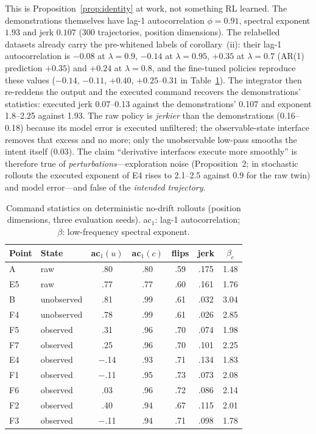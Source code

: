 \documentclass[conference]{IEEEtran}
\begin{document}
This is Proposition~\ref{prop:identity} at work, not something RL learned. The demonstrations themselves have lag-1 autocorrelation $\phi=0.91$, spectral exponent $1.93$ and jerk $0.107$ (300 trajectories, position dimensions). The relabelled datasets already carry the pre-whitened labels of corollary~(ii): their lag-1 autocorrelation is $-0.08$ at $\lambda=0.9$, $-0.14$ at $\lambda=0.95$, $+0.35$ at $\lambda=0.7$ (AR(1) prediction $+0.35$) and $+0.24$ at $\lambda=0.8$, and the fine-tuned policies reproduce these values ($-0.14$, $-0.11$, $+0.40$, $+0.25$--$0.31$ in Table~\ref{tab:white}). The integrator then re-reddens the output and the executed command recovers the demonstrations' statistics: executed jerk 0.07--0.13 against the demonstrations' 0.107 and exponent 1.8--2.25 against 1.93. The raw policy is \emph{jerkier} than the demonstrations (0.16--0.18) because its model error is executed unfiltered; the observable-state interface removes that excess and no more; only the unobservable low-pass smooths the intent itself (0.03). The claim ``derivative interfaces execute more smoothly'' is therefore true of \emph{perturbations}---exploration noise (Proposition~2; in stochastic rollouts the executed exponent of E4 rises to 2.1--2.5 against 0.9 for the raw twin) and model error---and false of the \emph{intended trajectory}.

\begin{table}[t]
\centering
\caption{Command statistics on deterministic no-drift rollouts (position dimensions, three evaluation seeds). ac$_1$: lag-1 autocorrelation; $\beta$: low-frequency spectral exponent.}
\label{tab:white}
\small
\begin{tabular}{l l cc c c c}
\toprule
Point & State & ac$_1(u)$ & ac$_1(c)$ & flips & jerk & $\beta_c$ \\
\midrule
A  & raw & .80 & .80 & .59 & .175 & 1.48 \\
E5 & raw & .77 & .77 & .60 & .161 & 1.76 \\
B  & unobserved & .81 & .99 & .61 & .032 & 3.04 \\
F4 & unobserved & .78 & .99 & .61 & .026 & 2.85 \\
F5 & observed & .31 & .96 & .70 & .074 & 1.98 \\
F7 & observed & .25 & .96 & .70 & .101 & 2.25 \\
E4 & observed & $-$.14 & .93 & .71 & .134 & 1.83 \\
F1 & observed & $-$.11 & .95 & .73 & .073 & 2.08 \\
F6 & observed & .03 & .96 & .72 & .086 & 2.14 \\
F2 & observed & .40 & .94 & .67 & .115 & 2.01 \\
F3 & observed & $-$.11 & .94 & .71 & .098 & 1.78 \\
\bottomrule
\end{tabular}
\end{table}
\end{document}
